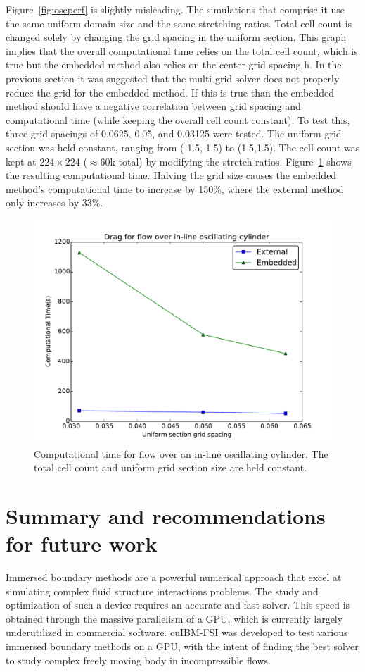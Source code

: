 Figure~\ref{fig:oscperf} is slightly misleading. 
The simulations that comprise it use the same uniform domain size and the same stretching ratios. 
Total cell count is changed solely by changing the grid spacing in the uniform section. 
This graph implies that the overall computational time relies on the total cell count, which is true but the embedded method also relies on the center grid spacing h. 
In the previous section it was suggested that the multi-grid solver does not properly reduce the grid for the embedded method. 
If this is true than the embedded method should have a negative correlation between grid spacing and computational time (while keeping the overall cell count constant). 
To test this, three grid spacings of 0.0625, 0.05, and 0.03125 were tested. 
The uniform grid section was held constant, ranging from (-1.5,-1.5) to (1.5,1.5). 
The cell count was kept at $224\times224$ ($\approx$60k total) by modifying the stretch ratios. 
Figure~\ref{fig:performance2} shows the resulting computational time. 
Halving the grid size causes the embedded method's computational time to increase by 150\%, where the external method only increases by 33\%.
\begin{figure}[!htb]
	\centering
	\includegraphics[width=0.6\linewidth]{performance_oscflow2}
	\caption{Computational time for flow over an in-line oscillating cylinder. The total cell count and uniform grid section size are held constant.}
	\label{fig:performance2}
\end{figure}
\chapter{Summary and recommendations for future work} 
Immersed boundary methods are a powerful numerical approach that excel at simulating complex fluid structure interactions problems. 
The study and optimization of such a device requires an accurate and fast solver. 
This speed is obtained through the massive parallelism of a GPU, which is currently largely underutilized in commercial software. 
cuIBM-FSI was developed to test various immersed boundary methods on a GPU, with the intent of finding the best solver to study complex freely moving body in incompressible flows. 

